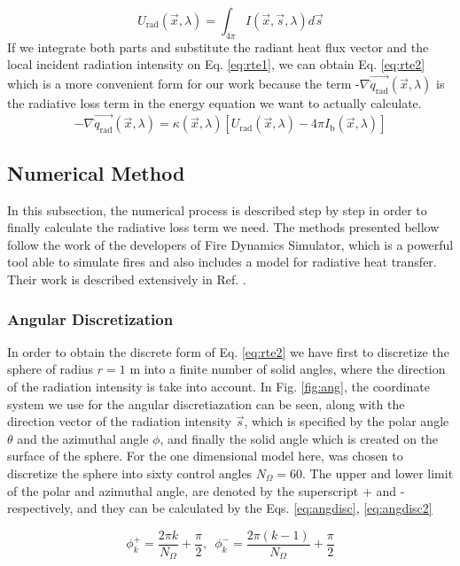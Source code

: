 \documentclass{warpdoc}
\begin{document}
\begin{equation}
    U_\text{rad}(\Vec{x},\lambda)=\int_{4\pi}^{} I(\Vec{x},\Vec{s},\lambda)d\Vec{s}
    \label{eq:incrad}
\end{equation}
If we integrate both parts and substitute the radiant heat flux vector and the local incident radiation intensity on Eq. \eqref{eq:rte1}, we can obtain Eq. \eqref{eq:rte2} which is a more convenient form for our work because the term -$\nabla \Vec{\dot{q}_\text{rad}}(\Vec{x},\lambda)$ is the radiative loss term in the energy equation we want to actually calculate.
\begin{equation}
     -\nabla \Vec{\dot{q}_\text{rad}}(\Vec{x},\lambda)=\kappa(\Vec{x},\lambda)[ U_\text{rad}(\Vec{x},\lambda)-4\pi I_\text{b}(\Vec{x},\lambda)]
    \label{eq:rte2}
\end{equation}

\subsection{Numerical Method}
In this subsection, the numerical process is described step by step in order to finally calculate the radiative loss term we need. The methods presented bellow follow the work of the developers of Fire Dynamics Simulator, which is a powerful tool able to simulate fires and also includes a model for radiative heat transfer. Their work is described extensively in Ref. \cite{fdstechnical}.
\subsubsection{Angular Discretization}
In order to obtain the discrete form of Eq. \eqref{eq:rte2} we have first to discretize the sphere of radius $r=1$ m into a finite number of solid angles, where the direction of the radiation intensity is take into account. In Fig. \ref{fig:ang}, the coordinate system we use for the angular discretiazation can be seen, along with the direction vector of the radiation intensity $\Vec{s}$, which is specified by the polar angle $\theta$ and the azimuthal angle $\phi$, and finally the solid angle which is created on the surface of the sphere. For the one dimensional model here, was chosen to discretize the sphere into sixty control angles $N_{\Omega}=60$. The upper and lower limit of the polar and azimuthal angle, are denoted by the superscript + and - respectively, and they can be calculated by the Eqs. \eqref{eq:angdisc}, \eqref{eq:angdisc2}

 \begin{equation}
    \phi_k^+=\frac{2\pi k}{N_{\Omega}}+\frac{\pi}{2},\enspace
    \phi_k^-=\frac{2\pi(k-1)}{N_{\Omega}}+\frac{\pi}{2} 
    \label{eq:angdisc}
 \end{equation}
 
\end{document}
